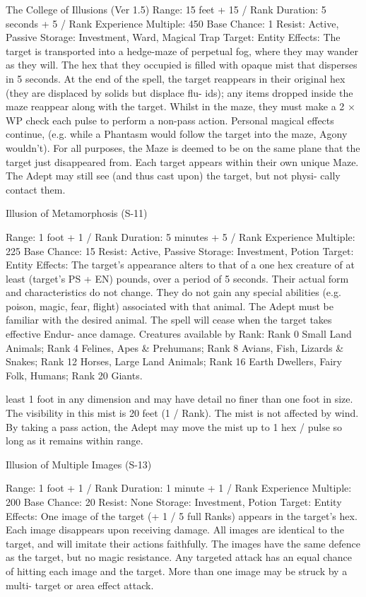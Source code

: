 \begin{Chapter}{The College of Illusions (Ver 1.5)}
Range: 15 feet + 15 / Rank 
Duration: 5 seconds + 5 / Rank 
Experience Multiple: 450 
Base Chance: 1%
Resist: Active, Passive 
Storage: Investment, Ward, Magical Trap 
Target: Entity 
Effects: The target is transported into a hedge-maze 
of  perpetual  fog,  where  they  may  wander  as  they 
will.  The  hex  that  they  occupied  is  filled  with 
opaque mist that disperses in 5 seconds. At the end 
of  the  spell,  the  target  reappears  in  their  original 
hex  (they  are  displaced  by  solids  but  displace  flu-
ids);  any  items  dropped  inside  the  maze  reappear 
along  with  the  target.  Whilst  in  the  maze,  they 
must make a 2 × WP check each pulse to perform a 
non-pass action. Personal magical effects continue, 
(e.g. while a Phantasm would follow the target into 
the  maze,  Agony  wouldn’t).  For  all  purposes,  the 
Maze  is  deemed  to  be  on  the  same  plane  that  the 
target  just  disappeared  from.  Each  target  appears 
within their own unique Maze. The Adept may still 
see  (and  thus  cast  upon)  the  target,  but  not  physi-
cally contact them. 

Illusion of Metamorphosis (S-11) 

Range: 1 foot + 1 / Rank 
Duration: 5 minutes + 5 / Rank 
Experience Multiple: 225 
Base Chance: 15%
Resist: Active, Passive 
Storage: Investment, Potion 
Target: Entity 
Effects:  The  target’s  appearance  alters  to  that  of  a 
one  hex  creature  of  at  least  (target’s  PS  +  EN) 
pounds,  over  a  period  of  5  seconds.  Their  actual 
form  and  characteristics  do  not  change.  They  do 
not  gain  any  special  abilities  (e.g.  poison,  magic, 
fear, flight) associated with that animal. The Adept 
must be familiar with the desired animal. The spell 
will  cease  when  the  target  takes  effective  Endur-
ance damage. Creatures available by Rank: Rank 0 
Small  Land  Animals;  Rank  4  Felines,  Apes  \& 
Prehumans;  Rank  8  Avians,  Fish,  Lizards  \& 
Snakes;  Rank  12  Horses,  Large  Land  Animals; 
Rank  16  Earth  Dwellers,  Fairy  Folk,  Humans; 
Rank 20 Giants. 

least  1  foot  in any  dimension  and  may  have  detail 
no finer than one foot in size. The visibility in this 
mist is 20 feet (1 / Rank). The mist is not affected 
by  wind.  By  taking  a  pass  action,  the  Adept  may 
move  the  mist  up  to  1  hex  /  pulse  so  long  as  it 
remains within range. 

Illusion of Multiple Images (S-13) 

Range: 1 foot + 1 / Rank 
Duration: 1 minute + 1 / Rank 
Experience Multiple: 200 
Base Chance: 20%
Resist: None 
Storage: Investment, Potion 
Target: Entity 
Effects: One image of the target (+ 1 / 5 full Ranks) 
appears in the target’s hex. Each image disappears 
upon receiving damage. All images are identical to 
the  target,  and  will  imitate  their  actions  faithfully. 
The  images  have  the  same  defence  as  the  target, 
but no magic resistance. Any targeted attack has an 
equal  chance  of  hitting  each  image  and  the  target. 
More  than  one  image  may  be  struck  by  a  multi-
target or area effect attack. 


\end{Chapter}
